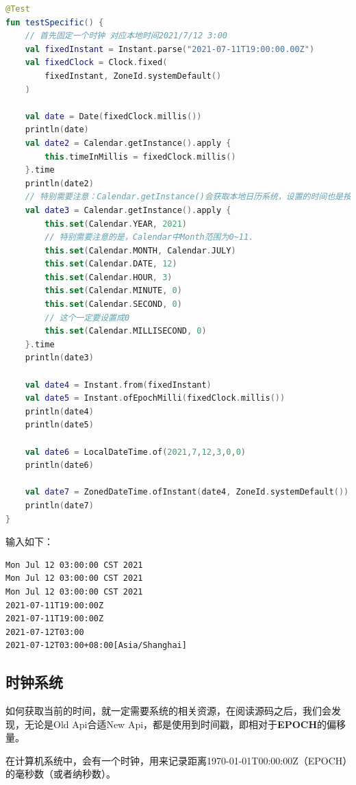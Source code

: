 \documentclass[cn,10pt,math=newtx,citestyle=gb7714-2015,bibstyle=gb7714-2015]{elegantbook}
\begin{document}
    \begin{lstlisting}[language=Kotlin]
@Test
fun testSpecific() {
    // 首先固定一个时钟 对应本地时间2021/7/12 3:00
    val fixedInstant = Instant.parse("2021-07-11T19:00:00.00Z")
    val fixedClock = Clock.fixed(
        fixedInstant, ZoneId.systemDefault()
    )

    val date = Date(fixedClock.millis())
    println(date)
    val date2 = Calendar.getInstance().apply {
        this.timeInMillis = fixedClock.millis()
    }.time
    println(date2)
    // 特别需要注意：Calendar.getInstance()会获取本地日历系统，设置的时间也是按照本地时间来设置的。
    val date3 = Calendar.getInstance().apply {
        this.set(Calendar.YEAR, 2021)
        // 特别需要注意的是，Calendar中Month范围为0~11.
        this.set(Calendar.MONTH, Calendar.JULY)
        this.set(Calendar.DATE, 12)
        this.set(Calendar.HOUR, 3)
        this.set(Calendar.MINUTE, 0)
        this.set(Calendar.SECOND, 0)
        // 这个一定要设置成0
        this.set(Calendar.MILLISECOND, 0)
    }.time
    println(date3)

    val date4 = Instant.from(fixedInstant)
    val date5 = Instant.ofEpochMilli(fixedClock.millis())
    println(date4)
    println(date5)

    val date6 = LocalDateTime.of(2021,7,12,3,0,0)
    println(date6)

    val date7 = ZonedDateTime.ofInstant(date4, ZoneId.systemDefault())
    println(date7)
}
    \end{lstlisting}

    输入如下：

    \begin{lstlisting}[]
Mon Jul 12 03:00:00 CST 2021
Mon Jul 12 03:00:00 CST 2021
Mon Jul 12 03:00:00 CST 2021
2021-07-11T19:00:00Z
2021-07-11T19:00:00Z
2021-07-12T03:00
2021-07-12T03:00+08:00[Asia/Shanghai]
    \end{lstlisting}

    \subsection{时钟系统}

    如何获取当前的时间，就一定需要系统的相关资源，在阅读源码之后，我们会发现，无论是Old Api合适New Api，都是使用到时间戳，即相对于\textbf{EPOCH}的偏移量。

    \begin{note}
        在计算机系统中，会有一个时钟，用来记录距离1970-01-01T00:00:00Z（EPOCH）的毫秒数（或者纳秒数）。
    \end{note}
\end{document}
